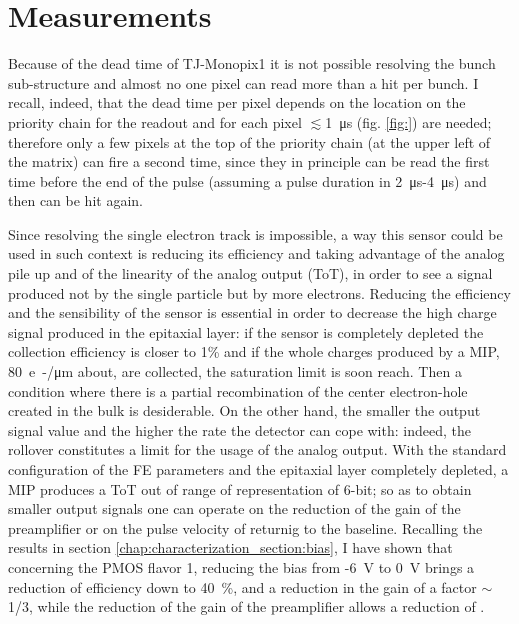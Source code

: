 \section{Measurements}
   Because of the dead time of TJ-Monopix1 it is not possible resolving the bunch sub-structure and almost no one pixel can read more than a hit per bunch. I recall, indeed, that the dead time per pixel depends on the location on the priority chain for the readout and for each pixel $\lesssim$\SI{1}{\us} (fig. \ref{fig:}) are needed; therefore only a few pixels at the top of the priority chain (at the upper left of the matrix) can fire a second time, since they in principle can be read the first time before the end of the pulse (assuming a pulse duration in \SI{2}{\us}-\SI{4}{\us}) and then can be hit again.

   Since resolving the single electron track is impossible, a way this sensor could be used in such context is reducing its efficiency and taking advantage of the analog pile up and of the linearity of the analog output (ToT), in order to see a signal produced not by the single particle but by more electrons. 
   Reducing the efficiency and the sensibility of the sensor is essential in order to decrease the high charge signal produced in the epitaxial layer: if the sensor is completely depleted the collection efficiency is closer to 1\% and if the whole charges produced by a MIP, \SI{80}{e-/\um} about, are collected, the saturation limit is soon reach. Then a condition where there is a partial recombination of the center electron-hole created in the bulk is desiderable.
   On the other hand, the smaller the output signal value and the higher the rate the detector can cope with: indeed, the rollover constitutes a limit for the usage of the analog output. 
   With the standard configuration of the FE parameters and the epitaxial layer completely depleted, a MIP produces a ToT out of range of representation of 6-bit; 
   so as to obtain smaller output signals one can operate on the reduction of the gain of the preamplifier or on the pulse velocity of returnig to the baseline. 
   Recalling the results in section \ref{chap:characterization_section:bias}, I have shown that concerning the PMOS flavor 1, reducing the bias from -\SI{6}{V} to \SI{0}{V} brings a reduction of efficiency down to \SI{40}{\%}, and a reduction in the gain of a factor $\sim$1/3, while the reduction of the gain of the preamplifier allows a reduction of .
   
